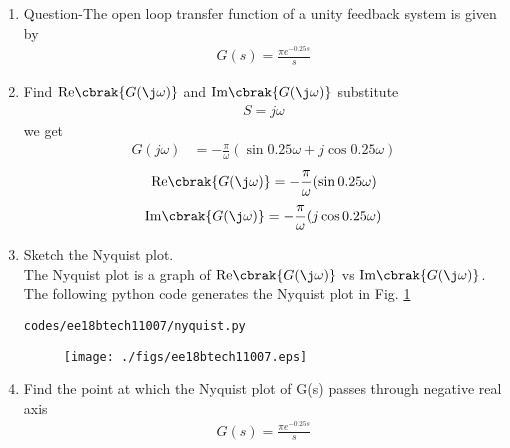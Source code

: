 \begin{enumerate}[label=\thesection.\arabic*.,ref=\thesection.\theenumi]

\item Question-The open loop transfer function of a unity feedback system is given by
\begin{align*}
 G(s)=\frac{\pi e^{-0.25s}}{s}
\end{align*}
\item Find  $\text{Re} \cbrak{G(\j \omega)}$ and  $\text{Im} \cbrak{G(\j \omega)}$
\newline
\solution 
substitute \begin{align}
S=j\omega
\end{align}
we get \begin{align}
G(j\omega)&=-\frac{\pi}{\omega}(\sin{0.25\omega}+j\cos{0.25\omega})
\end{align}
\begin{align}
 \text{Re} \cbrak{G(\j \omega)}=-\frac{\pi}{\omega}(\sin{0.25\omega}) 
\end{align}
\begin{align}
 \text{Im} \cbrak{G(\j \omega)}=-\frac{\pi}{\omega}(j\cos{0.25\omega}) 
\end{align}
\item Sketch the Nyquist plot.
\\
\solution The Nyquist plot is a graph of $\text{Re} \cbrak{G(\j \omega)}$  vs $\text{Im} \cbrak{G(\j \omega)}$.
The following python code generates the Nyquist plot in Fig.  \ref{fig:ee18btech11007}
\begin{lstlisting}
codes/ee18btech11007/nyquist.py
\end{lstlisting}
%
\begin{figure}[!h]
  \texttt{[image: ./figs/ee18btech11007.eps]}
  \caption{}
  \label{fig:ee18btech11007}
\end{figure}
%
\item Find the point at which the Nyquist plot of G(s) passes through negative real axis
\newline
\solution
\begin{align}
G(s)=\frac{\pi e^{-0.25s}}{s}
\end{align}


\end{enumerate}
